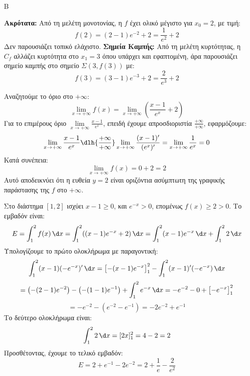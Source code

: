 \begin{thema}{Β}
\begin{erwthma}
\item \textbf{Ακρότατα:} Από τη μελέτη μονοτονίας, η $f$ έχει ολικό μέγιστο για $x_0=2$, με τιμή:
\[ f(2) = (2-1)e^{-2} + 2 = \frac{1}{e^2} + 2 \]
Δεν παρουσιάζει τοπικό ελάχιστο.
\textbf{Σημεία Καμπής:} Από τη μελέτη κυρτότητας, η $C_f$ αλλάζει κυρτότητα στο $x_1=3$ όπου υπάρχει και εφαπτομένη, άρα παρουσιάζει σημείο καμπής στο σημείο $\Sigma(3, f(3))$ με:
\[ f(3) = (3-1)e^{-3} + 2 = \frac{2}{e^3} + 2 \]

\item Αναζητούμε το όριο στο $+\infty$:
\[ \lim\limits_{x\to+\infty} f(x) = \lim\limits_{x\to+\infty} \left( \frac{x-1}{e^x} + 2 \right) \]
Για το επιμέρους όριο $\lim\limits_{x\to+\infty} \frac{x-1}{e^x}$, επειδή έχουμε απροσδιοριστία $\frac{+\infty}{+\infty}$, εφαρμόζουμε:
\[ \lim\limits_{x\to+\infty} \frac{x-1}{e^x}\dlh{\frac{+\infty}{+\infty}} \lim\limits_{x\to+\infty} \frac{(x-1)'}{(e^x)'} = \lim\limits_{x\to+\infty} \frac{1}{e^x} = 0 \]
Κατά συνέπεια:
\[ \lim\limits_{x\to+\infty} f(x) = 0 + 2 = 2 \]
Αυτό αποδεικνύει ότι η ευθεία $y = 2$ είναι οριζόντια ασύμπτωτη της γραφικής παράστασης της $f$ στο $+\infty$.

\item Στο διάστημα $[1, 2]$ ισχύει $x-1 \ge 0$, και $e^{-x} > 0$, επομένως $f(x) \ge 2 > 0$.
Το εμβαδόν είναι:
\[ E = \int_1^2 f(x)\,\d x = \int_1^2 ((x-1)e^{-x} + 2)\,\d x = \int_1^2 (x-1)e^{-x}\,\d x + \int_1^2 2\,\d x \]
Υπολογίζουμε το πρώτο ολοκλήρωμα με παραγοντική:
\[ \int_1^2 (x-1)(-e^{-x})'\,\d x = \left[ -(x-1)e^{-x} \right]_1^2 - \int_1^2 (x-1)'(-e^{-x})\,\d x \]
\[ = \left( -(2-1)e^{-2} \right) - \left( -(1-1)e^{-1} \right) + \int_1^2 e^{-x}\,\d x = -e^{-2} - 0 + \left[ -e^{-x} \right]_1^2 \]
\[ = -e^{-2} - (e^{-2} - e^{-1}) = -2e^{-2} + e^{-1} \]
Το δεύτερο ολοκλήρωμα είναι:
\[ \int_1^2 2\,\d x = [2x]_1^2 = 4 - 2 = 2 \]
Προσθέτοντας, έχουμε το τελικό εμβαδόν:
\[ E = 2 + e^{-1} - 2e^{-2} = 2 + \frac{1}{e} - \frac{2}{e^2} \]
\end{erwthma}
\end{thema}
